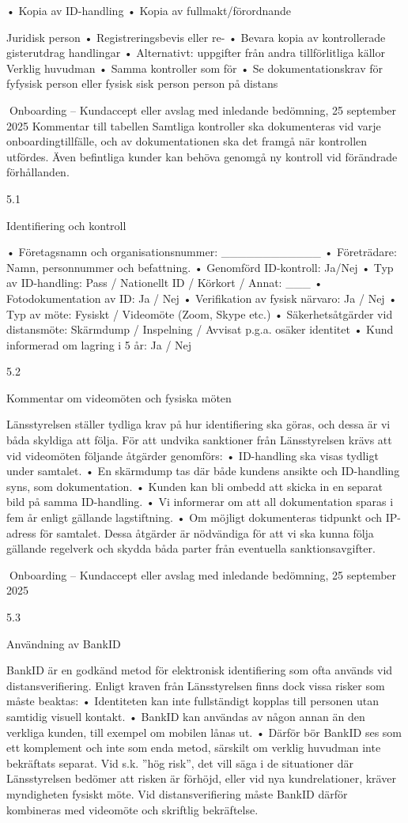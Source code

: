 • Kopia av ID-handling
• Kopia av fullmakt/förordnande

Juridisk person
• Registreringsbevis eller re- • Bevara kopia av kontrollerade
gisterutdrag
handlingar
• Alternativt: uppgifter från
andra tillförlitliga källor
Verklig huvudman
• Samma kontroller som för • Se dokumentationskrav för fyfysisk person eller fysisk
sisk person
person på distans

Onboarding – Kundaccept eller avslag med inledande bedömning,
25 september 2025
Kommentar till tabellen
Samtliga kontroller ska dokumenteras vid varje onboardingtillfälle, och av dokumentationen ska det framgå när kontrollen utfördes. Även befintliga kunder kan
behöva genomgå ny kontroll vid förändrade förhållanden.

5.1

Identifiering och kontroll

• Företagsnamn och organisationsnummer: ____________
• Företrädare: Namn, personnummer och befattning.
• Genomförd ID-kontroll: Ja/Nej
• Typ av ID-handling: Pass / Nationellt ID / Körkort / Annat: ___
• Fotodokumentation av ID: Ja / Nej
• Verifikation av fysisk närvaro: Ja / Nej
• Typ av möte: Fysiskt / Videomöte (Zoom, Skype etc.)
• Säkerhetsåtgärder vid distansmöte: Skärmdump / Inspelning / Avvisat p.g.a. osäker identitet
• Kund informerad om lagring i 5 år: Ja / Nej

5.2

Kommentar om videomöten och fysiska möten

Länsstyrelsen ställer tydliga krav på hur identifiering ska göras, och dessa är vi båda
skyldiga att följa. För att undvika sanktioner från Länsstyrelsen krävs att vid videomöten
följande åtgärder genomförs:
• ID-handling ska visas tydligt under samtalet.
• En skärmdump tas där både kundens ansikte och ID-handling syns, som dokumentation.
• Kunden kan bli ombedd att skicka in en separat bild på samma ID-handling.
• Vi informerar om att all dokumentation sparas i fem år enligt gällande lagstiftning.
• Om möjligt dokumenteras tidpunkt och IP-adress för samtalet.
Dessa åtgärder är nödvändiga för att vi ska kunna följa gällande regelverk och skydda
båda parter från eventuella sanktionsavgifter.

Onboarding – Kundaccept eller avslag med inledande bedömning,
25 september 2025

5.3

Användning av BankID

BankID är en godkänd metod för elektronisk identifiering som ofta används vid distansverifiering. Enligt kraven från Länsstyrelsen finns dock vissa risker som måste beaktas:
• Identiteten kan inte fullständigt kopplas till personen utan samtidig visuell kontakt.
• BankID kan användas av någon annan än den verkliga kunden, till exempel om mobilen
lånas ut.
• Därför bör BankID ses som ett komplement och inte som enda metod, särskilt om
verklig huvudman inte bekräftats separat.
Vid s.k. ”hög risk”, det vill säga i de situationer där Länsstyrelsen bedömer att risken
är förhöjd, eller vid nya kundrelationer, kräver myndigheten fysiskt möte. Vid distansverifiering måste BankID därför kombineras med videomöte och skriftlig bekräftelse.


